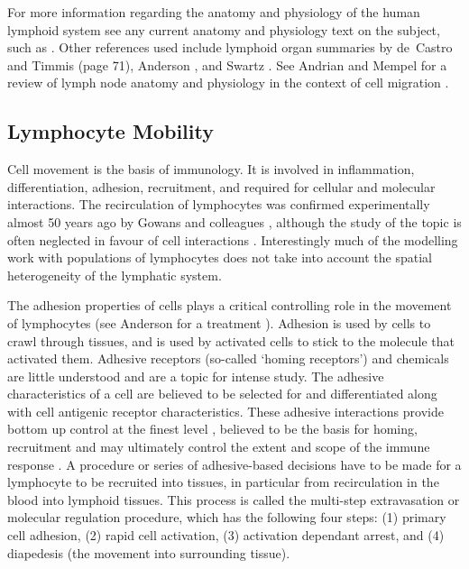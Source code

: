 For more information regarding the anatomy and physiology of the human lymphoid system see any current anatomy and physiology text on the subject, such as \cite{Marieb2006}. Other references used include lymphoid organ summaries by de~Castro and Timmis \cite{Castro2002a} (page 71), Anderson \cite{Anderson1990a}, and Swartz \cite{Swartz2001}. See Andrian and Mempel for a review of lymph node anatomy and physiology in the context of cell migration \cite{Andrian2003}.

%
% 
\subsection{Lymphocyte Mobility}
\label{subsec:tissues:migration:mobility}
Cell movement is the basis of immunology. It is involved in inflammation, differentiation, adhesion, recruitment, and required for cellular and molecular interactions. The recirculation of lymphocytes was confirmed experimentally almost 50 years ago by Gowans and colleagues \cite{Gowans1959, Gowans1964}, although the study of the topic is often neglected in favour of cell interactions \cite{Young1999a, Perelson1997}. Interestingly much of the modelling work with populations of lymphocytes does not take into account the spatial heterogeneity of the lymphatic system. 

The adhesion properties of cells plays a critical controlling role in the movement of lymphocytes (see Anderson for a treatment \cite{Anderson1990a}). Adhesion is used by cells to crawl through tissues, and is used by activated cells to stick to the molecule that activated them. Adhesive receptors (so-called `homing receptors') and chemicals are little understood and are a topic for intense study. The adhesive characteristics of a cell are believed to be selected for and differentiated along with cell antigenic receptor characteristics. These adhesive interactions provide bottom up control at the finest level \cite{Picker1992}, believed to be the basis for homing, recruitment and may ultimately control the extent and scope of the immune response \cite{Warnock1998}. A procedure or series of adhesive-based decisions have to be made for a lymphocyte to be recruited into tissues, in particular from recirculation in the blood into lymphoid tissues. This process is called the multi-step extravasation or molecular regulation procedure, which has the following four steps: (1) primary cell adhesion, (2) rapid cell activation, (3) activation dependant arrest, and (4) diapedesis (the movement into surrounding tissue).

